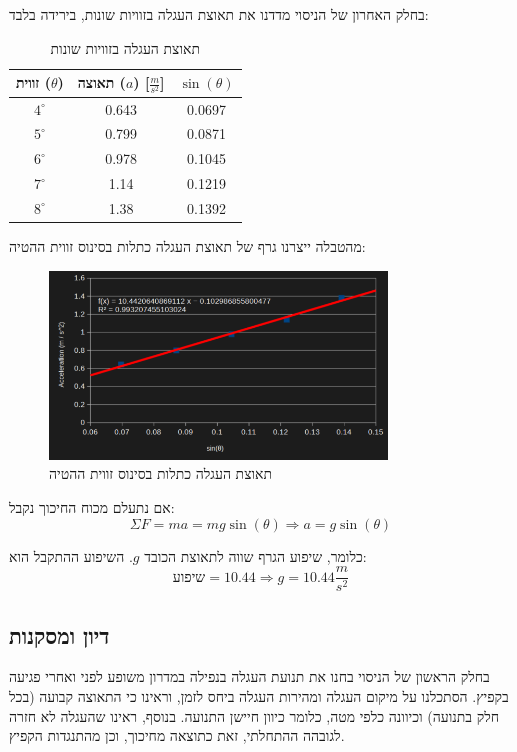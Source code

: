 \documentclass[14pt]{extarticle}
\begin{document}
בחלק האחרון של הניסוי מדדנו את תאוצת העגלה בזוויות שונות, בירידה בלבד:
\begin{table}[H]
    \centering
    \begin{tabular}{|c|c|c|}
        \hline
        זווית ($\theta$) & תאוצה ($a$) [$\frac{m}{s^2}$] & $\sin(\theta)$ \\
        \hline
        $4^\circ$ & 0.643 & 0.0697 \\
        $5^\circ$ & 0.799 & 0.0871 \\
        $6^\circ$ & 0.978 & 0.1045 \\
        $7^\circ$ & 1.14 & 0.1219 \\
        $8^\circ$ & 1.38 & 0.1392 \\
        \hline
    \end{tabular}
    \caption{תאוצת העגלה בזוויות שונות}
\end{table}

מהטבלה ייצרנו גרף של תאוצת העגלה כתלות בסינוס זווית ההטיה:

\begin{figure}[H]
    \centering
    \includegraphics[width=0.8\textwidth]{maman_13_experiment_2_acceleration_to_sin_degrees_graph.png}
    \caption{תאוצת העגלה כתלות בסינוס זווית ההטיה}
\end{figure}

אם נתעלם מכוח החיכוך נקבל:
\begin{equation}
\Sigma F = m a = m g \sin(\theta) \Rightarrow a = g \sin(\theta)
\end{equation}

כלומר, שיפוע הגרף שווה לתאוצת הכובד $g$.
השיפוע ההתקבל הוא:
\begin{equation}
\text{שיפוע} = 10.44 \Rightarrow g = 10.44 \frac{m}{s^2}
\end{equation}

\subsection*{דיון ומסקנות}
בחלק הראשון של הניסוי בחנו את תנועת העגלה בנפילה במדרון משופע לפני ואחרי פגיעה בקפיץ.
הסתכלנו על מיקום העגלה ומהירות העגלה ביחס לזמן,
וראינו כי התאוצה קבועה (בכל חלק בתנועה) וכיוונה כלפי מטה, כלומר כיוון חיישן התנועה.
בנוסף, ראינו שהעגלה לא חזרה לגובהה ההתחלתי, זאת כתוצאה מחיכוך, וכן מהתנגדות הקפיץ.
\end{document}
